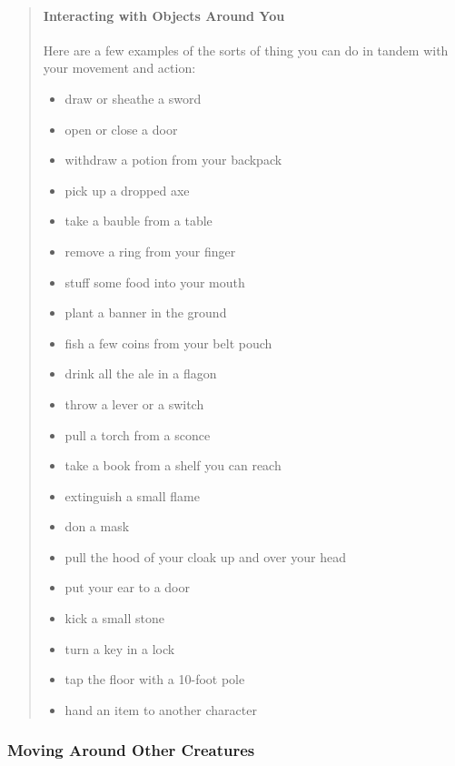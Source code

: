 \documentclass[
]{article}
\providecommand{\tightlist}{%
  \setlength{\itemsep}{0pt}\setlength{\parskip}{0pt}}
\begin{document}
\begin{quote}
\mbox{}%
\hypertarget{interacting-with-objects-around-you}{%
\paragraph{Interacting with Objects Around
You}\label{interacting-with-objects-around-you}}

Here are a few examples of the sorts of thing you can do in tandem with
your movement and action:

\begin{itemize}
\tightlist
\item
  draw or sheathe a sword
\item
  open or close a door
\item
  withdraw a potion from your backpack
\item
  pick up a dropped axe
\item
  take a bauble from a table
\item
  remove a ring from your finger
\item
  stuff some food into your mouth
\item
  plant a banner in the ground
\item
  fish a few coins from your belt pouch
\item
  drink all the ale in a flagon
\item
  throw a lever or a switch
\item
  pull a torch from a sconce
\item
  take a book from a shelf you can reach
\item
  extinguish a small flame
\item
  don a mask
\item
  pull the hood of your cloak up and over your head
\item
  put your ear to a door
\item
  kick a small stone
\item
  turn a key in a lock
\item
  tap the floor with a 10-foot pole
\item
  hand an item to another character
\end{itemize}
\end{quote}

\hypertarget{moving-around-other-creatures}{%
\subsubsection{Moving Around Other
Creatures}\label{moving-around-other-creatures}}
\end{document}
